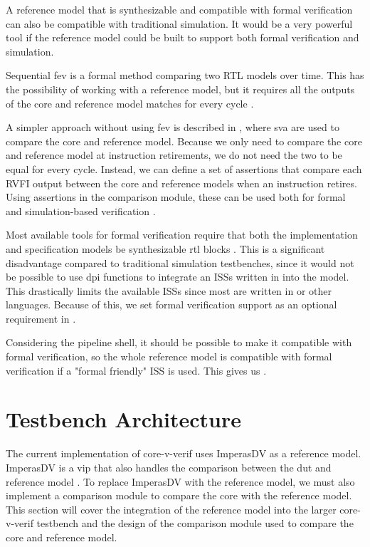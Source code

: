 A reference model that is synthesizable and compatible with formal verification can also be compatible with traditional simulation. It would be a very powerful tool if the reference model could be built to support both formal verification and simulation.

Sequential \acrfull{fev} is a formal method comparing two RTL models over time. This has the possibility of working with a reference model, but it requires all the outputs of the core and reference model matches for every cycle \cite{seligmanFormalVerificationEssential2015}.

A simpler approach without using \acrfull{fev} is described in , where  \acrfull{sva} are used to compare the core and reference model. Because we only need to compare the core and reference model at instruction retirements, we do not need the two to be equal for every cycle. Instead, we can define a set of assertions that compare each RVFI output between the core and reference models when an instruction retires. Using assertions in the comparison module, these can be used both for formal and simulation-based verification \cite{seligmanFormalVerificationEssential2015}.


Most available tools for formal verification require that both the implementation and specification models be synthesizable \acrshort{rtl} blocks \cite{seligmanFormalVerificationEssential2015}. This is a significant disadvantage compared to traditional simulation testbenches, since it would not be possible to use \acrshort{dpi} functions to integrate an ISSs written in \cpp into the model. This drastically limits the available ISSs since most are written in \cpp or other languages. Because of this, we set formal verification support as an optional requirement in .

Considering the pipeline shell, it should be possible to make it compatible with formal verification, so the whole reference model is compatible with formal verification if a "formal friendly" ISS is used. This gives us .


\section{Testbench Architecture}
\label{sec:testbench}


The current implementation of core-v-verif uses ImperasDV as a reference model. ImperasDV is a \acrfull{vip} that also handles the comparison between the \acrshort{dut} and reference model \cite{imperassoftwareltdRISCVProcessorOVP2023}. To replace ImperasDV with the reference model, we must also implement a comparison module to compare the core with the reference model. This section will cover the integration of the reference model into the larger core-v-verif testbench and the design of the comparison module used to compare the core and reference model.

